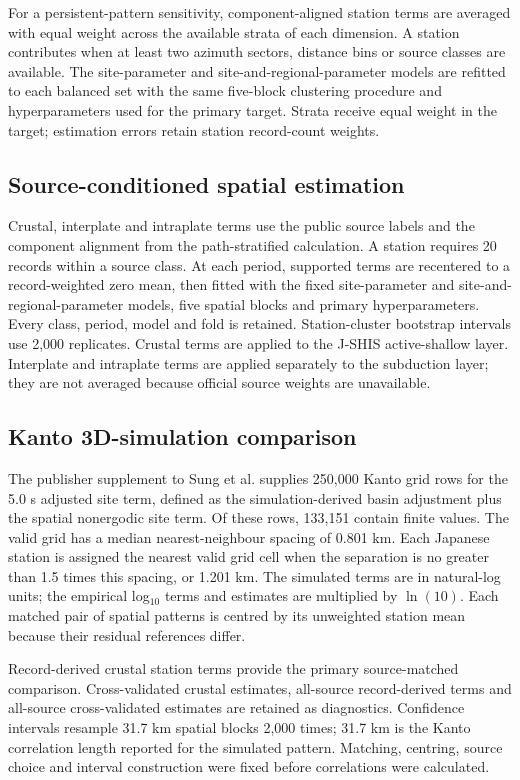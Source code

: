 \documentclass[11pt]{article}
\begin{document}
For a persistent-pattern sensitivity, component-aligned station terms are averaged with equal weight across the available strata of each dimension. A station contributes when at least two azimuth sectors, distance bins or source classes are available. The site-parameter and site-and-regional-parameter models are refitted to each balanced set with the same five-block clustering procedure and hyperparameters used for the primary target. Strata receive equal weight in the target; estimation errors retain station record-count weights.

\subsection{Source-conditioned spatial estimation}

Crustal, interplate and intraplate terms use the public source labels and the component alignment from the path-stratified calculation. A station requires 20 records within a source class. At each period, supported terms are recentered to a record-weighted zero mean, then fitted with the fixed site-parameter and site-and-regional-parameter models, five spatial blocks and primary hyperparameters. Every class, period, model and fold is retained. Station-cluster bootstrap intervals use 2,000 replicates. Crustal terms are applied to the J-SHIS active-shallow layer. Interplate and intraplate terms are applied separately to the subduction layer; they are not averaged because official source weights are unavailable.

\subsection{Kanto 3D-simulation comparison}

The publisher supplement to Sung et al. supplies 250,000 Kanto grid rows for the 5.0 s adjusted site term, defined as the simulation-derived basin adjustment plus the spatial nonergodic site term\cite{sung2025}. Of these rows, 133,151 contain finite values. The valid grid has a median nearest-neighbour spacing of 0.801 km. Each Japanese station is assigned the nearest valid grid cell when the separation is no greater than 1.5 times this spacing, or 1.201 km. The simulated terms are in natural-log units; the empirical log$_{10}$ terms and estimates are multiplied by $\ln(10)$. Each matched pair of spatial patterns is centred by its unweighted station mean because their residual references differ.

Record-derived crustal station terms provide the primary source-matched comparison. Cross-validated crustal estimates, all-source record-derived terms and all-source cross-validated estimates are retained as diagnostics. Confidence intervals resample 31.7 km spatial blocks 2,000 times; 31.7 km is the Kanto correlation length reported for the simulated pattern. Matching, centring, source choice and interval construction were fixed before correlations were calculated.
\end{document}
